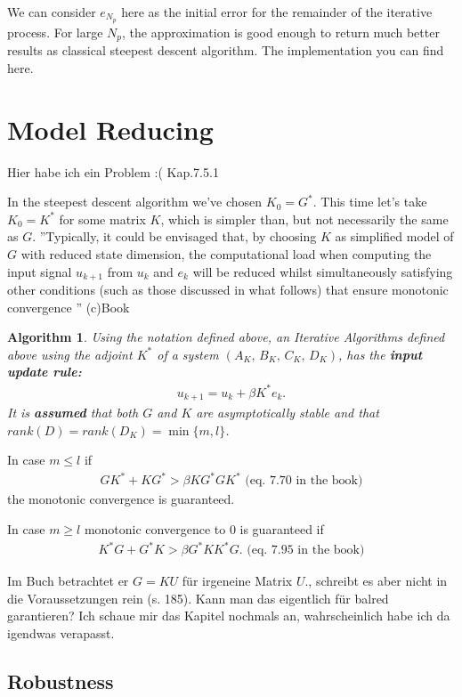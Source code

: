 \documentclass[12pt,ngerman]{article}
\newtheorem{alg}{Algorithm}
\begin{document}
We can consider $e_{N_p}$ here as the initial error for the remainder of the iterative process. For large $N_p$, the approximation is good enough to return much better results as classical steepest descent algorithm. The implementation you can find here.

\section{Model Reducing} 
{\color{red} Hier habe ich ein Problem :( Kap.7.5.1}


In the steepest descent algorithm we've chosen $K_0 = G^*$. This time let's take $K_0 = K^*$ for some matrix $K$, which is simpler than, but not necessarily the same as $G$. 
''Typically, it could be envisaged that, by choosing $K$ as simplified model of $G$ with reduced state dimension, the computational load when computing the input signal $u_{k+1}$ from $u_k$ and $e_k$ will be reduced whilst simultaneously satisfying other conditions (such as those discussed in what follows) that ensure monotonic convergence '' (c)Book

\begin{alg}
	Using the notation defined above, an Iterative Algorithms defined above using the adjoint $K^*$ of a system $(A_K,\, B_K,\, C_K,\, D_K)$, has the 
	\textbf{input update rule:}
	\begin{align}
	u_{k+1} = u_k + \beta K^* e_k.
	\end{align}
	It is \textbf{assumed} that both $G$ and $K$ are asymptotically stable and that $rank(D) = rank(D_K) = \min\{m,l\}$.
\end{alg}

In case $m\leq l$ if
\begin{align}
GK^* +KG^* > \beta KG^*GK^*  \text{ (eq. 7.70 in the book)}
\end{align}
the monotonic convergence is guaranteed. 

In case $m\geq l$ monotonic convergence to 0 is guaranteed if 
\begin{align}
K^* G + G^*K > \beta G^* K K^* G. \text{ (eq. 7.95 in the book)}
\end{align}

{\color{pink} Im Buch betrachtet er $G = KU$ für irgeneine Matrix $U$., schreibt es aber nicht in die Voraussetzungen rein (s. 185). Kann man das eigentlich für balred garantieren? Ich schaue mir das Kapitel nochmals an, wahrscheinlich habe ich da igendwas verapasst.}

\subsection{Robustness }
\end{document}
